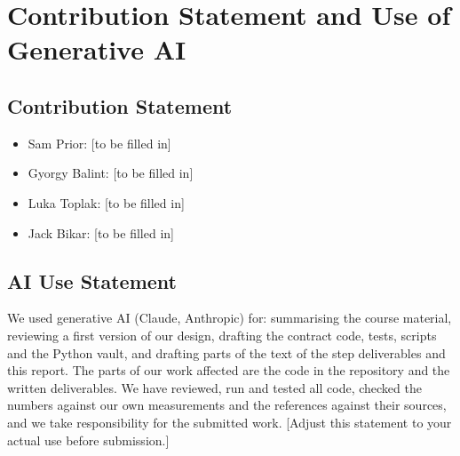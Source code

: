 \documentclass[10pt,a4paper]{article}
\begin{document}
\section{Contribution Statement and Use of Generative AI}

\subsection*{Contribution Statement}

\begin{itemize}
  \item Sam Prior: [to be filled in]
  \item Gyorgy Balint: [to be filled in]
  \item Luka Toplak: [to be filled in]
  \item Jack Bikar: [to be filled in]
\end{itemize}

\subsection*{AI Use Statement}

We used generative AI (Claude, Anthropic) for: summarising the course material, reviewing a first version of our design, drafting the contract code, tests, scripts and the Python vault, and drafting parts of the text of the step deliverables and this report. The parts of our work affected are the code in the repository and the written deliverables. We have reviewed, run and tested all code, checked the numbers against our own measurements and the references against their sources, and we take responsibility for the submitted work. [Adjust this statement to your actual use before submission.]
\end{document}
